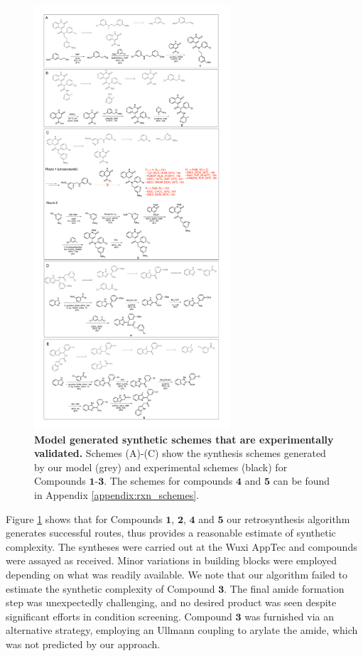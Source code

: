 \begin{figure}[!th]
 \centering
 \includegraphics[width=0.65\textwidth]{Chapters/Ranking/Figs/rxn_schemes_1_to_3.pdf}
 \caption{\textbf{Model generated synthetic schemes that are experimentally validated.} Schemes (A)-(C) show the synthesis schemes generated by our model (grey) and experimental schemes (black) for Compounds $\mathbf{1}$-$\mathbf{3}$. The schemes for compounds $\mathbf{4}$ and $\mathbf{5}$ can be found in Appendix \ref{appendix:rxn_schemes}.}
 \label{fig:synthesis_schemes}
 \end{figure}

Figure \ref{fig:synthesis_schemes} shows that for Compounds $\mathbf{1}$, $\mathbf{2}$, $\mathbf{4}$ and $\mathbf{5}$ our retrosynthesis algorithm generates successful routes, thus provides a reasonable estimate of synthetic complexity. The syntheses were carried out at the Wuxi AppTec and compounds were assayed as received. Minor variations in building blocks were employed depending on what was readily available. We note that our algorithm failed to estimate the synthetic complexity of Compound $\mathbf{3}$. The final amide formation step was unexpectedly challenging, and no desired product was seen despite significant efforts in condition screening. Compound $\mathbf{3}$ was furnished via an alternative strategy, employing an Ullmann coupling to arylate the amide, which was not predicted by our approach. 


